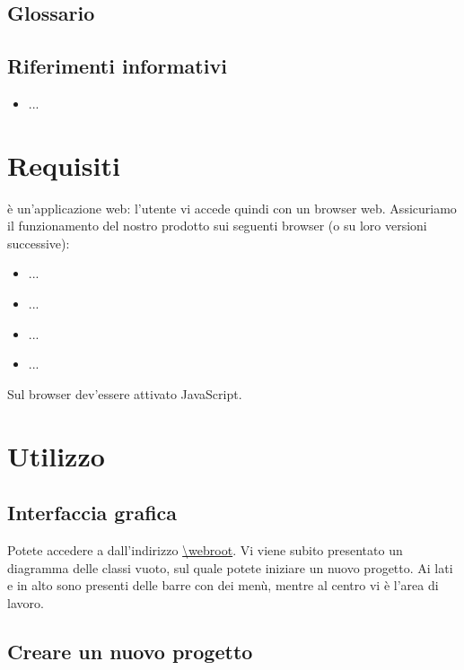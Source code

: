 \subsection{Glossario}
\presgloss

\subsection{Riferimenti informativi}
\begin{itemize}
	\item ...
\end{itemize}






\section{Requisiti}

\proj{} è un'applicazione web: l'utente vi accede quindi con un browser web. Assicuriamo il funzionamento del nostro prodotto sui seguenti browser (o su loro versioni successive):
\begin{itemize}
	\item ...
	\item ...
	\item ...
	\item ...
\end{itemize}
Sul browser dev'essere attivato JavaScript.






\section{Utilizzo} %


\subsection{Interfaccia grafica}

Potete accedere a \proj{} dall'indirizzo \url{\webroot}. Vi viene subito presentato un diagramma delle classi vuoto, sul quale potete iniziare un nuovo progetto. Ai lati e in alto sono presenti delle barre con dei menù, mentre al centro vi è l'area di lavoro.


\subsection{Creare un nuovo progetto}

